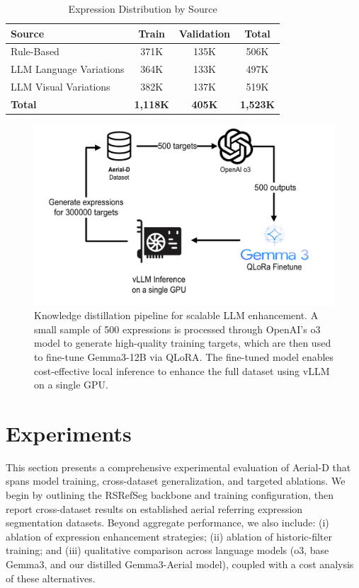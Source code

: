 \documentclass[journal]{IEEEtran}
\begin{document}
\begin{table}[t]
\centering
\caption{Expression Distribution by Source}
\label{tab:llm_enhancement_stats}
\footnotesize
\begin{tabular}{@{}lccc@{}}
\toprule
\textbf{Source} & \textbf{Train} & \textbf{Validation} & \textbf{Total} \\
\midrule
Rule-Based & 371K & 135K & 506K \\
LLM Language Variations & 364K & 133K & 497K \\
LLM Visual Variations & 382K & 137K & 519K \\
\midrule
\textbf{Total} & \textbf{1,118K} & \textbf{405K} & \textbf{1,523K} \\
\bottomrule
\end{tabular}
\end{table}

\begin{figure}[!b]
\centering
\includegraphics[width=\columnwidth]{./images/distillation.png}
\caption{Knowledge distillation pipeline for scalable LLM enhancement. A small sample of 500 expressions is processed through OpenAI's o3 model\cite{o3} to generate high-quality training targets, which are then used to fine-tune Gemma3-12B\cite{gemma3} via QLoRA\cite{qlora}. The fine-tuned model enables cost-effective local inference to enhance the full dataset using vLLM\cite{vllm} on a single GPU.}
\label{fig:llm_distillation}
\end{figure}

\section{Experiments}
\label{sec:experiments}

This section presents a comprehensive experimental evaluation of Aerial-D that spans model training, cross-dataset generalization, and targeted ablations. We begin by outlining the RSRefSeg backbone and training configuration, then report cross-dataset results on established aerial referring expression segmentation datasets. Beyond aggregate performance, we also include: (i) ablation of expression enhancement strategies; (ii) ablation of historic-filter training; and (iii) qualitative comparison across language models (o3, base Gemma3, and our distilled Gemma3-Aerial model), coupled with a cost analysis of these alternatives.
\end{document}
